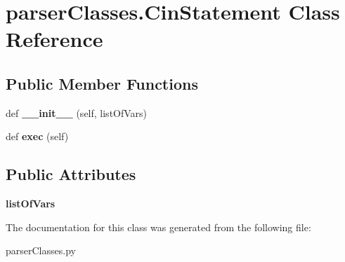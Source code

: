 \hypertarget{classparser_classes_1_1_cin_statement}{}\section{parser\+Classes.\+Cin\+Statement Class Reference}
\label{classparser_classes_1_1_cin_statement}
\subsection*{Public Member Functions}
\begin{DoxyCompactItemize}
\item 
def {\bfseries \+\_\+\+\_\+init\+\_\+\+\_\+} (self, list\+Of\+Vars)\hypertarget{classparser_classes_1_1_cin_statement_acf7ddabfd6a2442fbebb6b68e21e5fb0}{}\label{classparser_classes_1_1_cin_statement_acf7ddabfd6a2442fbebb6b68e21e5fb0}

\item 
def {\bfseries exec} (self)\hypertarget{classparser_classes_1_1_cin_statement_a719297478a7bd37daa8207850f8c15fe}{}\label{classparser_classes_1_1_cin_statement_a719297478a7bd37daa8207850f8c15fe}

\end{DoxyCompactItemize}
\subsection*{Public Attributes}
\begin{DoxyCompactItemize}
\item 
{\bfseries list\+Of\+Vars}\hypertarget{classparser_classes_1_1_cin_statement_a38f94082002dad9d674aefb99282b159}{}\label{classparser_classes_1_1_cin_statement_a38f94082002dad9d674aefb99282b159}

\end{DoxyCompactItemize}


The documentation for this class was generated from the following file\+:\begin{DoxyCompactItemize}
\item 
parser\+Classes.\+py\end{DoxyCompactItemize}
